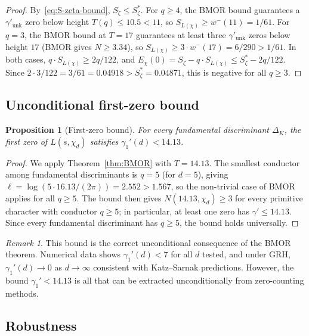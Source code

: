 \documentclass[12pt,reqno]{amsart}
\theoremstyle{plain}
\newtheorem{proposition}[theorem]{Proposition}
\theoremstyle{definition}
\theoremstyle{remark}
\newtheorem{remark}[theorem]{Remark}
\begin{document}
\begin{proof}
By~\eqref{eq:S-zeta-bound}, $S_\zeta \leq S_\zeta^*$. For $q \geq 4$, the BMOR bound guarantees a $\gamma'_{\mathrm{unk}}$ zero below height $T(q) \leq 10.5 < 11$, so $S_{L(\chi)} \geq w^-(11) = 1/61$. For $q = 3$, the BMOR bound at $T = 17$ guarantees at least three $\gamma'_{\mathrm{unk}}$ zeros below height $17$ (BMOR gives $N \geq 3.34$), so $S_{L(\chi)} \geq 3 \cdot w^-(17) = 6/290 > 1/61$. In both cases, $q \cdot S_{L(\chi)} \geq 2q/122$, and $E_\chi(0) = S_\zeta - q \cdot S_{L(\chi)} \leq S_\zeta^* - 2q/122$. Since $2 \cdot 3/122 = 3/61 = 0.04918 > S_\zeta^* = 0.04871$, this is negative for all $q \geq 3$.
\end{proof}

\subsection{Unconditional first-zero bound}

\begin{proposition}[First-zero bound]\label{prop:first-zero-bound}
For every fundamental discriminant $\Delta_K$, the first zero of $L(s, \chi_d)$ satisfies $\gamma_1'(d) < 14.13$.
\end{proposition}

\begin{proof}
We apply Theorem~\ref{thm:BMOR} with $T = 14.13$.  The smallest conductor among fundamental discriminants is $q = 5$ (for $d = 5$), giving $\ell = \log(5 \cdot 16.13/(2\pi)) = 2.552 > 1.567$, so the non-trivial case of BMOR applies for all $q \geq 5$.  The bound then gives $N(14.13, \chi_d) \geq 3$ for every primitive character with conductor $q \geq 5$; in particular, at least one zero has $\gamma' \leq 14.13$.  Since every fundamental discriminant has $q \geq 5$, the bound holds universally.
\end{proof}

\begin{remark}
This bound is the correct unconditional consequence of the BMOR theorem.  Numerical data shows $\gamma_1'(d) < 7$ for all $d$ tested, and under GRH, $\gamma_1'(d) \to 0$ as $d \to \infty$ consistent with Katz--Sarnak predictions.  However, the bound $\gamma_1' < 14.13$ is all that can be extracted unconditionally from zero-counting methods.
\end{remark}

\subsection{Robustness}
\end{document}
